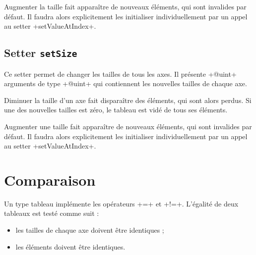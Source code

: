 Augmenter la taille fait apparaître de nouveaux éléments, qui sont invalides par défaut. Il faudra alors explicitement les initialiser individuellement par un appel au setter \ggs+setValueAtIndex+.




\subsection{Setter \texttt{setSize}}

Ce setter permet de changer les tailles de tous les axes. Il présente \ggs+@uint+ arguments de type \ggs+@uint+ qui contiennent les nouvelles tailles de chaque axe.

Diminuer la taille d'un axe fait disparaître des éléments, qui sont alors perdus. Si une des nouvelles tailles est zéro, le tableau est vidé de tous ses éléments.

Augmenter une taille fait apparaître de nouveaux éléments, qui sont invalides par défaut. Il faudra alors explicitement les initialiser individuellement par un appel au setter \ggs+setValueAtIndex+.


\section{Comparaison}

Un type tableau implémente les opérateurs \ggs+=+ et \ggs+!=+. L'égalité de deux tableaux est testé comme suit :
\begin{itemize}
  \item les tailles de chaque axe doivent être identiques ;
  \item les éléments doivent être identiques.
\end {itemize}
